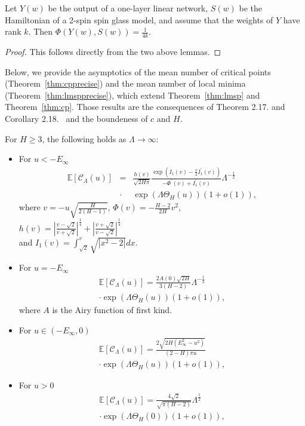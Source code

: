 \documentclass[twoside]{article}
\begin{document}
\begin{theorem}
 Let $Y(w)$ be the output of a one-layer linear network, $S(w)$ be the Hamiltonian of a 2-spin spin glass model, and assume that the weights of $Y$ have rank $k$. 
 Then $\Phi(Y(w),S(w)) = \frac{1}{4k}$.
\end{theorem}

\begin{proof}
 This follows directly from the two above lemmas.
\end{proof}

Below, we provide the asymptotics of the mean number of critical points (Theorem~\ref{thm:cpprecise}) and the mean number of local minima (Theorem~\ref{thm:lmspprecise}), which extend Theorem~\ref{thm:lmsp} and Theorem~\ref{thm:cp}. Those results are the consequences of Theorem 2.17. and Corollary 2.18.~\cite{AAC2010} and the boundeness of $c$ and $H$.
\begin{theorem}
For $H \geq 3$, the following holds as $\Lambda \rightarrow \infty$:
\begin{itemize}
\item For $u < -E_{\infty}$\\
\begin{eqnarray*}
\mathbb{E}[\mathcal{C}_{\Lambda}(u)] \!\!\!&=&\!\!\! \frac{h(v)}{\sqrt{2H\pi}}\frac{\exp(I_1(v) - \frac{v}{2}I_1^{'}(v))}{-\Phi^{'}(v) + I_1^{'}(v)}\Lambda^{-\frac{1}{2}}\\
&\cdot& \exp\left(\Lambda\Theta_H(u)\right)(1 + o(1)),
\end{eqnarray*}
where $v = -u\sqrt{\frac{H}{2(H-1)}}$, $\Phi(v) = -\frac{H-2}{2H}v^2$,\\
$h(v) = \left|\frac{v-\sqrt{2}}{v + \sqrt{2}}\right|^{\frac{1}{4}} + \left|\frac{v+\sqrt{2}}{v - \sqrt{2}}\right|^{\frac{1}{4}}$\\
and $I_1(v) = \int_{\sqrt{2}}^{v}\sqrt{|x^2 - 2|}dx$.
\item For $u = -E_{\infty}$\\
\begin{eqnarray*}
\mathbb{E}[\mathcal{C}_{\Lambda}(u)] = \frac{2A(0)\sqrt{2H}}{3(H-2)}\Lambda^{-\frac{1}{3}}\\
\cdot\exp\left(\Lambda\Theta_H(u)\right)(1 + o(1)),
\end{eqnarray*}
where $A$ is the Airy function of first kind.
\item For $u \in (-E_{\infty},0)$\\
\begin{eqnarray*}
\mathbb{E}[\mathcal{C}_{\Lambda}(u)] = \frac{2\sqrt{2H(E_{\infty}^2-u^2)}}{(2-H)\pi u}\\
\cdot\exp\left(\Lambda \Theta_H(u)\right)(1 + o(1)),
\end{eqnarray*}
\item For $u > 0$\\
\begin{eqnarray*}
\mathbb{E}[\mathcal{C}_{\Lambda}(u)] = \frac{4\sqrt{2}}{\sqrt{\pi(H-2)}}\Lambda^{\frac{1}{2}}\\
\cdot\exp\left(\Lambda\Theta_H(0)\right)(1 + o(1)),
\end{eqnarray*}
\end{itemize}
\label{thm:cpprecise}
\end{theorem}
\end{document}
